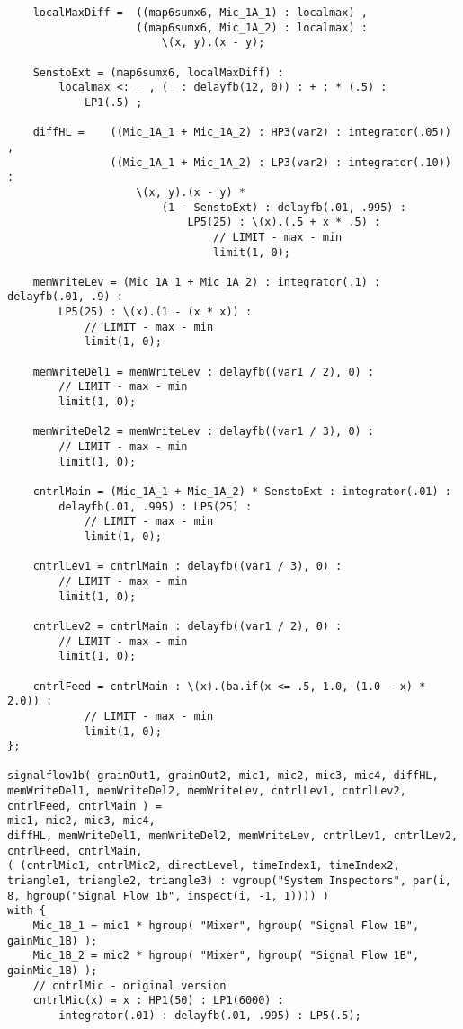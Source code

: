 \begin{lstlisting}
    localMaxDiff =  ((map6sumx6, Mic_1A_1) : localmax) ,
                    ((map6sumx6, Mic_1A_2) : localmax) :
                        \(x, y).(x - y);

    SenstoExt = (map6sumx6, localMaxDiff) : 
        localmax <: _ , (_ : delayfb(12, 0)) : + : * (.5) : 
            LP1(.5) ;

    diffHL =    ((Mic_1A_1 + Mic_1A_2) : HP3(var2) : integrator(.05)) ,
                ((Mic_1A_1 + Mic_1A_2) : LP3(var2) : integrator(.10)) :
                    \(x, y).(x - y) * 
                        (1 - SenstoExt) : delayfb(.01, .995) : 
                            LP5(25) : \(x).(.5 + x * .5) : 
                                // LIMIT - max - min
                                limit(1, 0);

    memWriteLev = (Mic_1A_1 + Mic_1A_2) : integrator(.1) : delayfb(.01, .9) :
        LP5(25) : \(x).(1 - (x * x)) : 
            // LIMIT - max - min
            limit(1, 0);

    memWriteDel1 = memWriteLev : delayfb((var1 / 2), 0) : 
        // LIMIT - max - min
        limit(1, 0);

    memWriteDel2 = memWriteLev : delayfb((var1 / 3), 0) : 
        // LIMIT - max - min
        limit(1, 0);

    cntrlMain = (Mic_1A_1 + Mic_1A_2) * SenstoExt : integrator(.01) : 
        delayfb(.01, .995) : LP5(25) : 
            // LIMIT - max - min
            limit(1, 0);

    cntrlLev1 = cntrlMain : delayfb((var1 / 3), 0) : 
        // LIMIT - max - min
        limit(1, 0);

    cntrlLev2 = cntrlMain : delayfb((var1 / 2), 0) : 
        // LIMIT - max - min
        limit(1, 0);

    cntrlFeed = cntrlMain : \(x).(ba.if(x <= .5, 1.0, (1.0 - x) * 2.0)) : 
            // LIMIT - max - min
            limit(1, 0);
};

signalflow1b( grainOut1, grainOut2, mic1, mic2, mic3, mic4, diffHL, memWriteDel1, memWriteDel2, memWriteLev, cntrlLev1, cntrlLev2, cntrlFeed, cntrlMain ) = 
mic1, mic2, mic3, mic4, 
diffHL, memWriteDel1, memWriteDel2, memWriteLev, cntrlLev1, cntrlLev2, cntrlFeed, cntrlMain, 
( (cntrlMic1, cntrlMic2, directLevel, timeIndex1, timeIndex2, triangle1, triangle2, triangle3) : vgroup("System Inspectors", par(i, 8, hgroup("Signal Flow 1b", inspect(i, -1, 1)))) )
with {
    Mic_1B_1 = mic1 * hgroup( "Mixer", hgroup( "Signal Flow 1B", gainMic_1B) );
    Mic_1B_2 = mic2 * hgroup( "Mixer", hgroup( "Signal Flow 1B", gainMic_1B) );
    // cntrlMic - original version
    cntrlMic(x) = x : HP1(50) : LP1(6000) : 
        integrator(.01) : delayfb(.01, .995) : LP5(.5);


\end{lstlisting}
